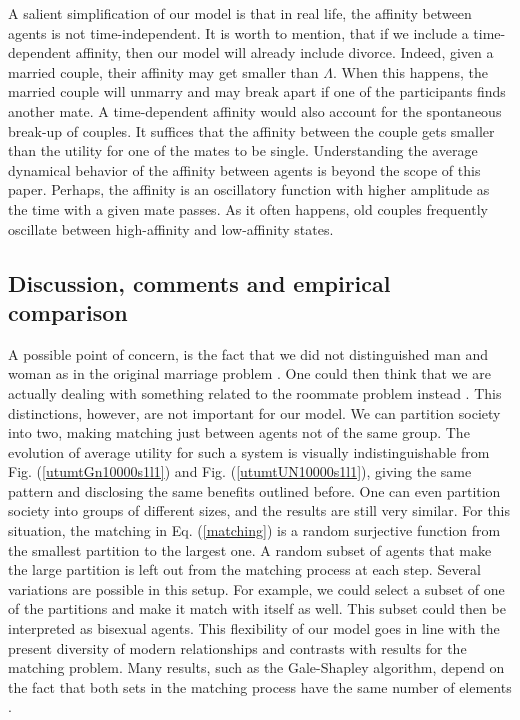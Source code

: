 \documentclass[12pt]{article}
\begin{document}
A salient simplification of our model is that in real life, the affinity between agents is not time-independent. It is worth to mention, that if we include a time-dependent affinity, then our model will already include divorce. Indeed, given a married couple, their affinity may get smaller than $\Lambda$. When this happens, the married couple will unmarry and may break apart if one of the participants finds another mate. A time-dependent affinity would also account for the spontaneous break-up of couples. It suffices that the affinity between the couple gets smaller than the utility for one of the mates to be single. Understanding the average dynamical behavior of the affinity between agents is beyond the scope of this paper. Perhaps, the affinity is an oscillatory function with higher amplitude as the time with a given mate passes. As it often happens, old couples frequently oscillate between high-affinity and low-affinity states.


\subsection{Discussion, comments and empirical comparison}
\label{discussionandcomments}

A possible point of concern, is the fact that we did not distinguished man and woman as in the original marriage problem \cite{10.2307/2312726}. One could then think that we are actually dealing with something related to the roommate problem instead \cite{10.2307/2312726}. This distinctions, however, are not important for our model. We can partition society into two, making matching just between agents not of the same group. The evolution of average utility for such a system is visually indistinguishable from Fig. (\ref{utumtGn10000s1l1}) and Fig. (\ref{utumtUN10000s1l1}), giving the same pattern and disclosing the same benefits outlined before. One can even partition society into groups of different sizes, and the results are still very similar. For this situation, the matching in Eq. (\ref{matching}) is a random surjective function from the smallest partition to the largest one. A random subset of agents that make the large partition is left out from the matching process at each step. Several variations are possible in this setup. For example, we could select a subset of one of the partitions and make it match with itself as well. This subset could then be interpreted as bisexual agents. This flexibility of our model goes in line with the present diversity of modern relationships and contrasts with results for the matching problem. Many results, such as the Gale-Shapley algorithm, depend on the fact that both sets in the matching process have the same number of elements \cite{roth1992two}.
\end{document}
